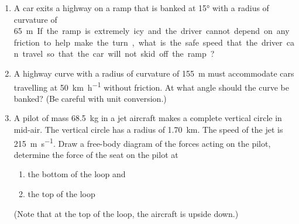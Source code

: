 \begin{enumerate}[itemsep=6pt]
%  
%  
  
\item A car exits a highway on a ramp that is banked at \ang{15} with a radius
  of curvature of \SI{65}\metre. If the ramp is extremely icy and the driver
  cannot depend on any friction to help make the turn, what is the safe speed
  that the driver can travel so that the car will not skid off the ramp? 
  
\item A highway curve with a radius of curvature of \SI{155}{\metre} must
  accommodate cars travelling at \SI{50}{\kilo\metre\per\hour} without
  friction. At what angle should the curve be banked? (Be careful with unit
  conversion.)

\item A pilot of mass \SI{68.5}{\kilo\gram} in a jet aircraft makes a complete
  vertical circle in mid-air. The vertical circle has a radius of
  \SI{1.70}{\kilo\metre}. The speed of the jet is \SI{215}{\metre\per\second}.
  Draw a free-body diagram of the forces acting on the pilot, determine the
  force of the seat on the pilot at
  \begin{enumerate}[itemsep=3pt]
  \item the bottom of the loop and
  \item the top of the loop
  \end{enumerate}
  (Note that at the top of the loop, the aircraft is upside down.)
 

\end{enumerate}
